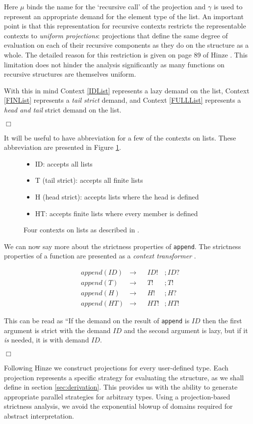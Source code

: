 Here $\mu$ binds the name for the `recursive call' of the projection and
$\gamma$ is used to represent an appropriate demand for the element type of the
list.  An important point is that this representation for recursive contexts
restricts the representable contexts to \emph{uniform projections}: projections
that define the same degree of evaluation on each of their recursive components
as they do on the structure as a whole. The detailed reason for this
restriction is given on page 89 of Hinze \citep{hinze1995projection}. This
limitation does not hinder the analysis significantly as many functions on
recursive structures are themselves uniform.

With this in mind Context \ref{IDList} represents a lazy demand on the list,
Context \ref{FINList} represents a \emph{tail strict} demand, and Context
\ref{FULLList} represents a \emph{head and tail} strict demand on the list.

\hfill$\Box$

It will be useful to have abbreviation for a few of the contexts on lists. These
abbreviation are presented in Figure \ref{contexts}.

\begin{figure}[h!]
\begin{itemize}
    \item[] ID: accepts all lists
    \item[] T (tail strict): accepts all finite lists
    \item[] H (head strict): accepts lists where the head is defined
    \item[] HT: accepts finite lists where every member is defined
\end{itemize}
\caption{Four contexts on lists as described in \citep{wadler1987projections}.}
\label{contexts}
\end{figure}

We can now say more about the strictness properties of \verb'append'. The
strictness properties of a function are presented as a \emph{context
transformer} \citep{hinze1995projection}. 

\begin{align*}
    &append(ID) &\rightarrow &&ID!&;ID? \\
    &append(T)  &\rightarrow &&T!&;T! \\
    &append(H)  &\rightarrow &&H!&;H? \\
    &append(HT) &\rightarrow &&HT!&;HT!
\end{align*}

This can be read as ``If the demand on the result of \verb-append- is $ID$
then the first argument is strict with the demand $ID$ and the second
argument is lazy, but if it \emph{is} needed, it is with demand $ID$.

\hfill$\Box$

Following Hinze \citep{hinze1995projection} we construct projections
for every user-defined type. Each projection represents a
specific strategy for evaluating the structure, as we shall define in section
\ref{sec:derivation}. This provides us with the ability to generate
appropriate parallel strategies for arbitrary types. Using a
projection-based strictness analysis, we avoid the exponential blowup
of domains required for abstract interpretation.
